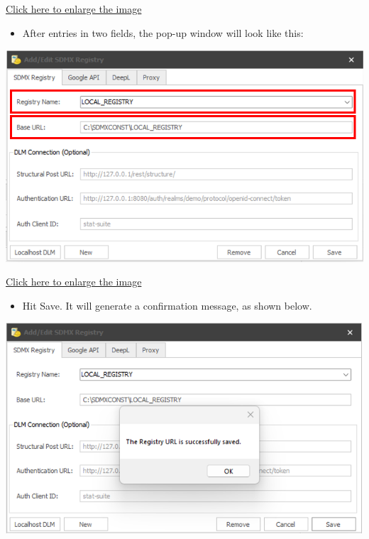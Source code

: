 \documentclass[
]{book}
\providecommand{\tightlist}{%
  \setlength{\itemsep}{0pt}\setlength{\parskip}{0pt}}
\begin{document}
\href{images/image052.png}{Click here to enlarge the image}

\begin{itemize}
\tightlist
\item
  After entries in two fields, the pop-up window will look like this:
\end{itemize}

\begin{center}\includegraphics[width=1\linewidth]{./images/image054} \end{center}

\href{images/image054.png}{Click here to enlarge the image}

\begin{itemize}
\tightlist
\item
  Hit Save. It will generate a confirmation message, as shown below.
\end{itemize}

\begin{center}\includegraphics[width=1\linewidth]{./images/image056} \end{center}
\end{document}
